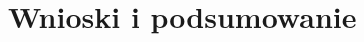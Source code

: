 \newpage
\chapter{Wnioski i podsumowanie}
\cite{ong2006classification}
\cite{alajmi2014selecting}
\cite{boyabatli2004parameter}
\cite{elbeltagi2005comparison}
\cite{mihail2016influence}
